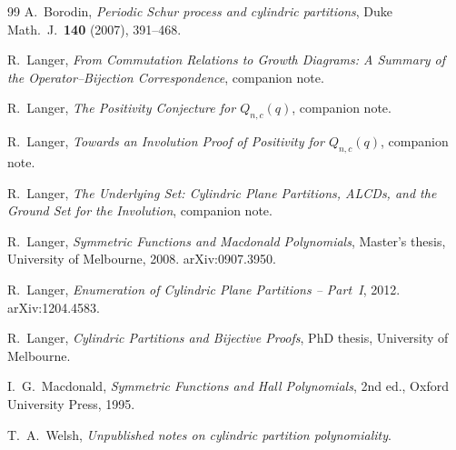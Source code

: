 \documentclass[11pt]{article}
\theoremstyle{plain}
\theoremstyle{definition}
\begin{document}
\begin{thebibliography}{99}
  A.~Borodin,
  \emph{Periodic Schur process and cylindric partitions},
  Duke Math.~J.\ \textbf{140} (2007), 391--468.

  R.~Langer,
  \emph{From Commutation Relations to Growth Diagrams:
  A Summary of the Operator--Bijection Correspondence},
  companion note.

  R.~Langer,
  \emph{The Positivity Conjecture for $Q_{n,c}(q)$},
  companion note.

  R.~Langer,
  \emph{Towards an Involution Proof of Positivity for $Q_{n,c}(q)$},
  companion note.

  R.~Langer,
  \emph{The Underlying Set: Cylindric Plane Partitions, ALCDs,
  and the Ground Set for the Involution},
  companion note.

  R.~Langer,
  \emph{Symmetric Functions and Macdonald Polynomials},
  Master's thesis, University of Melbourne, 2008.
  arXiv:0907.3950.

  R.~Langer,
  \emph{Enumeration of Cylindric Plane Partitions -- Part~I},
  2012. arXiv:1204.4583.

  R.~Langer,
  \emph{Cylindric Partitions and Bijective Proofs},
  PhD thesis, University of Melbourne.

  I.~G.~Macdonald,
  \emph{Symmetric Functions and Hall Polynomials},
  2nd ed., Oxford University Press, 1995.

  T.~A.~Welsh,
  \emph{Unpublished notes on cylindric partition polynomiality}.
\end{thebibliography}
\end{document}
